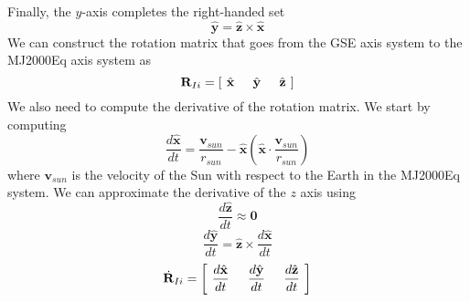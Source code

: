 {%
%
Finally, the $y$-axis completes the right-handed set
%
\begin{equation}
    \hat{\mathbf{y}} = \hat{\mathbf{z}} \times \hat{\mathbf{x}}
\end{equation}
%
We can construct the rotation matrix that goes from the GSE axis
system to the MJ2000Eq axis system as
%
\begin{equation}
     \mathbf{R}_{Ii} = \left[\hspace{.05 in} \hat{\mathbf{x}} \hspace{.2 in} \hat{\mathbf{y}} \hspace{.2 in} \hat{\mathbf{z}} \hspace{.05 in} \right]
\end{equation}
%
We also need to compute the derivative of the rotation matrix.  We
start by computing
%
\begin{equation}
     \frac{d\hat{\mathbf{x}}}{dt} =      \displaystyle\frac{\mathbf{v}_{sun}}{r_{sun}}  -\displaystyle
     \hat{\mathbf{x}}
     \left(\hat{\mathbf{x}}  \cdot
     \frac{\mathbf{v}_{sun}}{r_{sun}} \right)
\end{equation}
%
where $\mathbf{v}_{sun}$ is the velocity of the Sun with respect
to the Earth in the MJ2000Eq system.  We can approximate the
derivative of the $z$ axis using
%
\begin{equation}
     \frac{d\hat{\mathbf{z}}}{dt} \approx      \mathbf{0}
\end{equation}
%
\begin{equation}
     \frac{d\hat{\mathbf{y}}}{dt} =     \hat{\mathbf{z}} \times  \frac{d\hat{\mathbf{x}}}{dt}
\end{equation}
%
\begin{equation}
     \dot{\mathbf{R}}_{Ii} = \left[\hspace{.05 in} \frac{d\hat{\mathbf{x}}}{dt} \hspace{.2 in}
     \frac{d\hat{\mathbf{y}}}{dt} \hspace{.2 in} \frac{d\hat{\mathbf{z}}}{dt} \hspace{.05 in} \right]
\end{equation}


}
